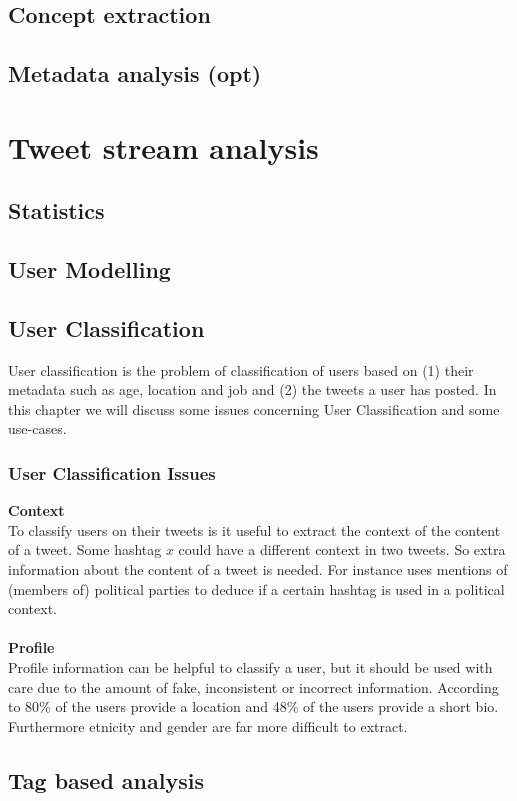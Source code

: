 \documentclass{article}
\begin{document}
\newpage
\subsection{Concept extraction}
\subsection{Metadata analysis (opt)}

\section{Tweet stream analysis}
\subsection{Statistics}
\subsection{User Modelling}
\subsection{User Classification}
User classification is the problem of classification of users based on (1) their metadata such as age, location and job and (2) the tweets a user has posted. In this chapter we will discuss some issues concerning User Classification and some use-cases. 

\subsubsection{User Classification Issues}
\textbf{Context}\\
To classify users on their tweets is it useful to extract the context of the content of a tweet. Some hashtag $x$ could have a different context in two tweets. So extra information about the content of a tweet is needed. For instance \cite{userclasst} uses mentions of (members of) political parties to deduce if a certain hashtag is used in a political context. 
\\\\
\textbf{Profile}\\
Profile information can be helpful to classify a user, but it should be used with care due to the amount of fake, inconsistent or incorrect information. According to \cite{usermachine} 80\% of the users provide a location and 48\% of the users provide a short bio. Furthermore etnicity and gender are far more difficult to extract. 
\subsection{Tag based analysis}
\end{document}
